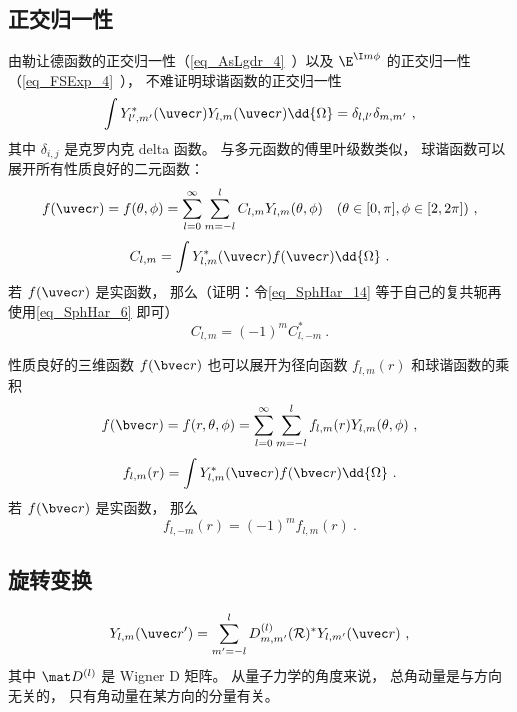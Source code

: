 \subsection{正交归一性}
由勒让德函数的正交归一性（\autoref{eq_AsLgdr_4}~）以及 $\E^{\I m \phi}$  的正交归一性（\autoref{eq_FSExp_4}~）， 不难证明球谐函数的正交归一性
\begin{equation}
\int Y_{l', m'}^*(\uvec r) Y_{l, m} (\uvec r) \dd{\Omega} = \delta_{l,l'}\delta_{m,m'}~,
\end{equation}
其中 $\delta_{i,j}$ 是克罗内克 delta 函数。 与多元函数的傅里叶级数类似， 球谐函数可以展开所有性质良好的二元函数：
\begin{equation}\label{eq_SphHar_14}
f(\uvec r) = f(\theta, \phi) = \sum_{l = 0}^\infty\sum_{m=-l}^l C_{l,m}Y_{l,m}(\theta, \phi) \quad (\theta \in [0, \pi], \phi \in [2, 2\pi])~,
\end{equation}
\begin{equation}
C_{l,m} = \int Y^*_{l,m}(\uvec r) f(\uvec r) \dd{\Omega}~.
\end{equation}
若 $f(\uvec r)$ 是实函数， 那么（证明：令\autoref{eq_SphHar_14} 等于自己的复共轭再使用\autoref{eq_SphHar_6} 即可）
\begin{equation}\label{eq_SphHar_13}
C_{l,m} = (-1)^m C_{l,-m}^*~.
\end{equation}

性质良好的三维函数 $f(\bvec r)$ 也可以展开为径向函数 $f_{l,m}(r)$ 和球谐函数的乘积
\begin{equation}\label{eq_SphHar_9}
f(\bvec r) = f(r, \theta, \phi) = \sum_{l = 0}^\infty\sum_{m=-l}^l f_{l,m}(r) Y_{l,m}(\theta, \phi)~,
\end{equation}
\begin{equation}\label{eq_SphHar_7}
f_{l,m}(r) = \int Y^*_{l,m}(\uvec r) f(\bvec r) \dd{\Omega}~.
\end{equation}
若 $f(\bvec r)$ 是实函数， 那么
\begin{equation}
f_{l,-m}(r) = (-1)^m f_{l,m}(r)~.
\end{equation}

\subsection{旋转变换}
\begin{equation}
Y_{l,m}(\uvec r') = \sum_{m'=-l}^l D_{m,m'}^{(l)} (\mathcal R)^* Y_{l,m'}(\uvec r)~,
\end{equation}
其中 $\mat D^{(l)}$ 是 Wigner D 矩阵。 从量子力学的角度来说， 总角动量是与方向无关的， 只有角动量在某方向的分量有关。

